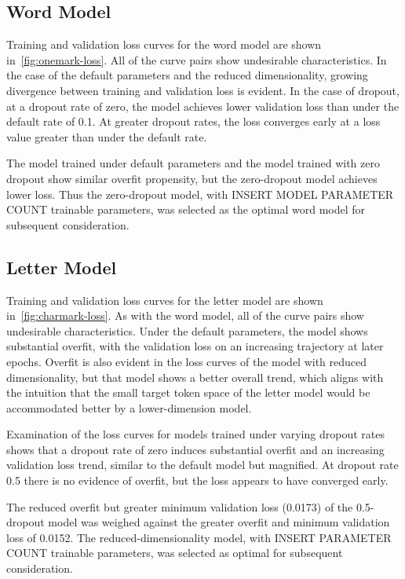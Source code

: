 \documentclass[letterpaper]{article} %
\begin{document}
\begin{NoHyper}
\subsection{Word Model}
\label{subsec:word}

Training and validation loss curves for the word model are shown in~\ref{fig:onemark-loss}.
All of the curve pairs show undesirable characteristics.
In the case of the default parameters and the reduced dimensionality, growing divergence between training and validation loss is evident.
In the case of dropout, at a dropout rate of zero, the model achieves lower validation loss than under the default rate of 0.1. At greater dropout rates, the loss converges  early at a loss value greater than under the default rate.

The model trained under default parameters and the model trained with zero dropout show similar overfit propensity, but the zero-dropout model achieves lower loss.
Thus the zero-dropout model, with INSERT MODEL PARAMETER COUNT trainable parameters, was selected as the optimal word model for subsequent consideration.

\subsection{Letter Model}
\label{subsec:letter}

Training and validation loss curves for the letter model are shown in~\ref{fig:charmark-loss}.
As with the word model, all of the curve pairs show undesirable characteristics.
Under the default parameters, the model shows substantial overfit, with the validation loss on an increasing trajectory at later epochs.
Overfit is also evident in the loss curves of the model with reduced dimensionality, but that model shows a better overall trend, which aligns with the intuition that the small target token space of the letter model would be accommodated better by a lower-dimension model.

Examination of the loss curves for models trained under varying dropout rates shows that a dropout rate of zero induces substantial overfit and an increasing validation loss trend, similar to the default model but magnified.
At dropout rate 0.5 there is no evidence of overfit, but the loss appears to have converged early.

The reduced overfit but greater minimum validation loss (0.0173) of the 0.5-dropout model was weighed against the greater overfit and minimum validation loss of 0.0152.
The reduced-dimensionality model, with INSERT PARAMETER COUNT trainable parameters, was selected as optimal for subsequent consideration.


\end{NoHyper}
\end{document}
